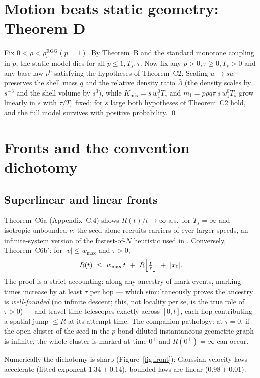 \documentclass[11pt]{article}
\newcommand{\Kmix}{K_{\mathrm{mix}}}
\newcommand{\Ts}{T_s}
\newcommand{\relL}{\bar\Lambda}
\begin{document}
\section{Motion beats static geometry: Theorem D}\label{sec:thmD}

Fix $0<\rho<\rho_c^{\mathrm{RGG}}(p{=}1)$. By Theorem~B and the standard
monotone coupling in $p$, the static model dies for all $p\le1,\Ts,\tau$.
Now fix any $p>0,\tau\ge0,\Ts>0$ and any base law $\nu^0$ satisfying the
hypotheses of Theorem~C2. Scaling $w\mapsto sw$ preserves the shell mass
$q$ and the relative density ratio $\relL$ (the density scales by $s^{-3}$
and the shell volume by $s^3$), while $\Kmix=s\,w_1^0\Ts$ and
$m_1=p\rho q\pi\,s\,w_1^0\Ts$ grow linearly in $s$ with $\tau/\Ts$ fixed;
for $s$ large both hypotheses of Theorem~C2 hold, and the full model
survives with positive probability. \qed

\section{Fronts and the convention dichotomy}\label{sec:fronts}

\subsection{Superlinear and linear fronts}
Theorem~C6a (Appendix~C.4) shows $R(t)/t\to\infty$ a.s.\ for $\Ts=\infty$
and isotropic unbounded $\nu$: the seed alone recruits carriers of ever-larger speeds,
an infinite-system version of the fastest-of-$N$ heuristic used in
\cite{cn19}. Conversely, Theorem~C6b$'$: for $|v|\le w_{\max}$ and $\tau>0$,
\[
  R(t)\ \le\ w_{\max}\,t\ +\ R\Bigl\lfloor \tfrac{t}{\tau}\Bigr\rfloor\ +\ |x_0| .
\]
The proof is a strict accounting: along any ancestry of mark events,
marking times increase by at least $\tau$ per hop --- which simultaneously
proves the ancestry is \emph{well-founded} (no infinite descent; this, not
locality per se, is the true role of $\tau>0$) --- and travel time telescopes
exactly across $[0,t]$, each hop contributing a spatial jump $\le R$ at its
attempt time. The companion pathology: at $\tau=0$, if the open cluster of
the seed in the $p$-bond-diluted instantaneous geometric graph is infinite,
the whole cluster is marked at time $0^+$ and $R(0^+)=\infty$ can occur.

Numerically the dichotomy is sharp (Figure~\ref{fig:front}): Gaussian
velocity laws accelerate (fitted exponent $1.34\pm0.14$), bounded laws are
linear ($0.98\pm0.01$).
\end{document}
